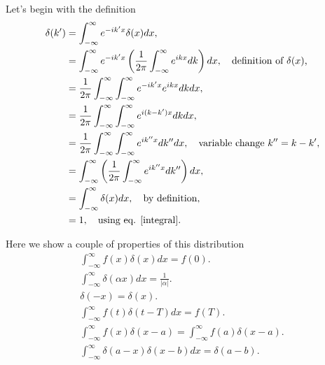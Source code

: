 \begin{questions}
\begin{solution}
  Let's begin with the definition
  \begin{equation*}
    \begin{aligned}
      \delta(k') &= \int_{-\infty}^\infty e^{-ik'x}\delta(x)dx,\\
      &= \int_{-\infty}^\infty e^{-ik'x}\left(\frac{1}{2\pi}\int_{-\infty}^\infty e^{ikx}dk\right)dx, \quad \textnormal{definition of $\delta(x)$,}\\
      &= \frac{1}{2\pi}\int_{-\infty}^\infty \int_{-\infty}^\infty e^{-ik'x} e^{ikx}dkdx,\\
      &= \frac{1}{2\pi}\int_{-\infty}^\infty \int_{-\infty}^\infty  e^{i(k-k')x}dkdx,\\
      &= \frac{1}{2\pi}\int_{-\infty}^\infty \int_{-\infty}^\infty  e^{ik''x}dk''dx, \quad \textnormal{variable change $k'' = k-k'$},\\
      &= \int_{-\infty}^\infty \left( \frac{1}{2\pi}\int_{-\infty}^\infty  e^{ik''x}dk''\right)dx,\\
      &= \int_{-\infty}^\infty \delta(x) dx, \quad \textnormal{by definition},\\
      &= 1, \quad \textnormal{using eq. \ref{integral}}.
    \end{aligned}
  \end{equation*}

\end{solution}

\begin{solution}
 Here we show a couple of properties of this distribution
 \begin{eqnarray}
   \int_{-\infty}^\infty f(x)\delta(x)dx = f(0).\\
   \int_{-\infty}^\infty \delta(\alpha x)dx = \frac{1}{|\alpha|}.\\
   \delta(-x) = \delta(x).\\
   \int_{-\infty}^\infty f(t)\delta(t-T)dx = f(T).\\
   \int_{-\infty}^\infty f(x)\delta(x-a) = \int_{-\infty}^\infty f(a)\delta(x-a).\\
   \int_{-\infty}^\infty \delta(a-x)\delta(x-b)dx = \delta(a-b).
 \end{eqnarray}
\end{solution}


\end{questions}
